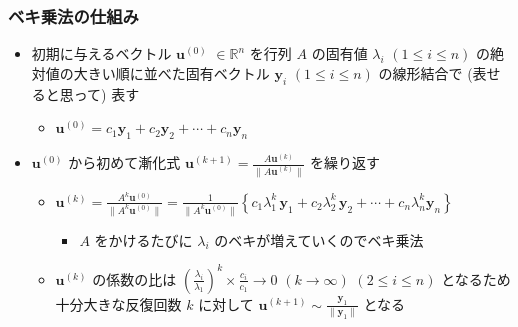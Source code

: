 \documentclass[dvipdfmx,aspectratio=169,20pt]{beamer}
\newcommand{\myfontsetting}[3]{{\fontsize{#1}{#2}\selectfont #3}}
\begin{document}
\begin{frame}
\frametitle{\myfontsetting{28pt}{28pt}{ベキ乗法の仕組み}}

\begin{itemize}
    \setlength{\itemsep}{0.05cm}
    \item \myfontsetting{15pt}{15pt}{
    初期に与えるベクトル $\bm{u}^{(0)}$ \myfontsetting{10pt}{10pt}{$\in \mathbb{R}^n$} を行列 $A$ の固有値 $\lambda_i$ \myfontsetting{10pt}{10pt}{$(1\le i \le n)$} の絶対値の大きい順に並べた固有ベクトル $\bm{y}_i$ \myfontsetting{10pt}{10pt}{$(1\le i \le n)$} の線形結合で \myfontsetting{10pt}{10pt}{(表せると思って)} 表す
    }
    \begin{itemize}
        \item \myfontsetting{15pt}{15pt}{
        $\bm{u}^{(0)}=c_1\bm{y}_1+c_2\bm{y}_2+\cdots +c_n \bm{y}_n$
        }
    \end{itemize}
    \item \myfontsetting{15pt}{15pt}{
    $\bm{u}^{(0)}$ から初めて漸化式 \myfontsetting{12pt}{12pt}{$\bm{u}^{(k+1)} = \frac{A\bm{u}^{(k)}}{\|A\bm{u}^{(k)}\|}$} を繰り返す
    }
    \begin{itemize}
        \setlength{\itemsep}{0.05cm}
        \item \myfontsetting{12pt}{12pt}{
        $\bm{u}^{(k)}=\frac{A^k \bm{u}^{(0)}}{\|A^k \bm{u}^{(0)}\|}=\frac{1}{\|A^k \bm{u}^{(0)}\|}\left\{c_1 \lambda_1^k\, \bm{y}_1 + c_2 \lambda_2^k\, \bm{y}_2+\cdots +c_n \lambda_n^k \bm{y}_n\right\}$
        }
        \vspace{1mm}
        \begin{itemize}
            \setlength{\itemsep}{0.05cm}
            \item \myfontsetting{10pt}{10pt}{
                $A$ をかけるたびに $\lambda_i$ のベキが増えていくのでベキ乗法
            }
        \end{itemize}
        \item \myfontsetting{12pt}{12pt}{
        $\bm{u}^{(k)}$ の係数の比は $\left(\frac{\lambda_i}{\lambda_1} \right)^k \times \frac{c_i}{c_1} \to 0$ $(k\to \infty)$ \myfontsetting{8pt}{8pt}{$(2\le i \le n)$} となるため
        十分大きな反復回数 $k$ に対して $\bm{u}^{(k+1)} \sim \frac{\bm{y}_1}{\|\bm{y}_1\|}$ となる
        }
    \end{itemize}
\end{itemize}

\end{frame}
\end{document}
